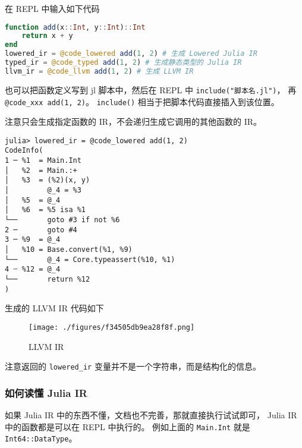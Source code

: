 在 REPL 中输入如下代码
\begin{lstlisting}[language=julia,caption=julia]
function add(x::Int, y::Int)::Int
    return x + y
end
lowered_ir = @code_lowered add(1, 2) # 生成 Lowered Julia IR
typed_ir = @code_typed add(1, 2) # 生成静态类型的 Julia IR
llvm_ir = @code_llvm add(1, 2) # 生成 LLVM IR
\end{lstlisting}

也可以把函数定义写到 jl 脚本中，然后在 REPL 中 \verb`include("脚本名.jl")`， 再 \verb`@code_xxx add(1, 2)`。 \verb`include()` 相当于把脚本代码直接插入到该位置。

注意只会生成指定函数的 IR，不会递归生成它调用的其他函数的 IR。

\begin{lstlisting}[language=none,caption=julia ir]
julia> lowered_ir = @code_lowered add(1, 2)
CodeInfo(
1 ─ %1  = Main.Int
│   %2  = Main.:+
│   %3  = (%2)(x, y)   
│         @_4 = %3
│   %5  = @_4
│   %6  = %5 isa %1
└──       goto #3 if not %6
2 ─       goto #4
3 ─ %9  = @_4
│   %10 = Base.convert(%1, %9)
└──       @_4 = Core.typeassert(%10, %1)
4 ┄ %12 = @_4
└──       return %12
)
\end{lstlisting}

生成的 LLVM IR 代码如下
\begin{figure}[ht]
\centering
\texttt{[image: ./figures/f34505db9ea28f8f.png]}
\caption{LLVM IR} \label{fig_julia0_2}
\end{figure}

注意返回的 \verb`lowered_ir` 变量并不是一个字符串，而是结构化的信息。

\subsubsection{如何读懂 Julia IR}
如果 Julia IR 中的东西不懂，文档也不完善，那就直接执行试试即可， Julia IR 中的函数都是可以在 REPL 中执行的。 例如上面的 \verb`Main.Int` 就是 \verb`Int64::DataType`。

